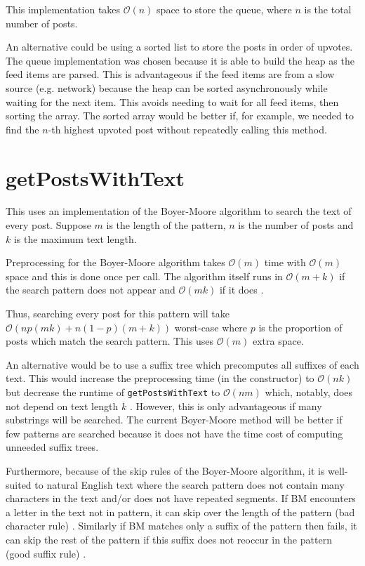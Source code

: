 \documentclass[11pt,a4paper]{article} %
\begin{document}
This implementation takes $\mathcal O(n)$ space to store the queue,
where $n$ is the total number of posts. 

An alternative could be using a sorted list to store the posts 
in order of upvotes.
The queue implementation was 
chosen because it is able to build the heap as the feed items are parsed.
This is advantageous if the feed items are from a slow source (e.g. network)
because the heap can be sorted asynchronously while waiting for the next 
item. This avoids needing to wait for all feed items, then sorting the array.
The sorted array would be better if, for example, we needed to find the $n$-th highest 
upvoted post without repeatedly calling this method.

\section*{getPostsWithText}
This uses an implementation of the Boyer-Moore algorithm to search 
the text of every post. Suppose $m$ is the length of the  pattern,
 $n$ is the number of posts and $k$ is the maximum text length.

Preprocessing for the Boyer-Moore algorithm takes $\mathcal O(m)$ time
with $\mathcal O(m)$ space 
and this is done once per call.
The algorithm itself runs in $\mathcal O(m + k)$ if the 
search pattern does not appear and $\mathcal O(mk)$ if it does \cite{sustik}. 

Thus, searching every post for this pattern will take $\mathcal O(np(mk) + n(1-p)(m+k))$
worst-case where $p$ is the proportion of posts which match the search pattern.
This uses $\mathcal O(m)$ extra space.

An alternative would be to use a suffix tree which precomputes all suffixes of 
each text. This would increase the preprocessing time (in the constructor) 
to $\mathcal O(nk)$ but decrease the runtime of \verb|getPostsWithText|
to $\mathcal O(nm)$ which, notably, does not depend on text length $k$ \cite{suffix}.
However, this is only advantageous if many substrings will be searched. The current 
Boyer-Moore method will be better if few patterns are searched because it does not 
have the time cost of computing unneeded suffix trees.
 
Furthermore, because of the skip rules of the Boyer-Moore algorithm, it is 
well-suited to natural English text where the search pattern does not contain many 
characters in the text and/or does not have repeated segments. 
If BM encounters a letter in the text not in pattern, it can skip over the length of the pattern
(bad character rule) \cite{jhu}.
Similarly if BM matches only a suffix of the pattern then fails, it can skip the rest of the pattern 
if this suffix does not reoccur in the pattern (good suffix rule) \cite{jhu}.



\end{document}

